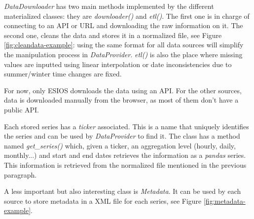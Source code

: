 \textit{DataDownloader} has two main methods implemented by the different materialized classes: they are \textit{downloader()} and \textit{etl()}. The first one is in charge of connecting to an API or URL and downloading the raw information on it. The second one, cleans the data and stores it in a normalized file, see Figure \ref{fig:cleandata-example}: using the same format for all data sources will simplify the manipulation process in \textit{DataProvider}. \textit{etl()} is also the place where missing values are inputted using linear interpolation or date inconsistencies due to summer/winter time changes are fixed.

For now, only ESIOS downloads the data using an API. For the other sources, data is downloaded manually from the browser, as most of them don't have a public API.

Each stored series has a \textit{ticker} associated. This is a name that uniquely identifies the series and can be used by \textit{DataProvider} to find it. The class has a method named \textit{get\_series()} which, given a ticker, an aggregation level (hourly, daily, monthly...) and start and end dates retrieves the information as a \textit{pandas} series. This information is retrieved from the normalized file mentioned in the previous paragraph.

A less important but also interesting class is \textit{Metadata}. It can be used by each source to store metadata in a XML file for each series, see Figure \ref{fig:metadata-example}.

